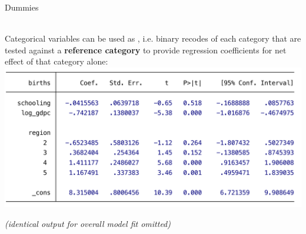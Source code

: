 \documentclass{beamer}
\begin{document}
	\begin{frame}[t]{Dummies}

	\\[.5em]
	
	Categorical variables can be used as , i.e. binary recodes of each category that are tested against a \textbf{reference category} to provide regression coefficients for net effect of that category alone:\\[.5em]
	
	\includegraphics[scale=.45]{images/mreg-output-dummies.pdf}
	
	\textit{(identical output for overall model fit omitted)}

	\end{frame}
	
\end{document}
